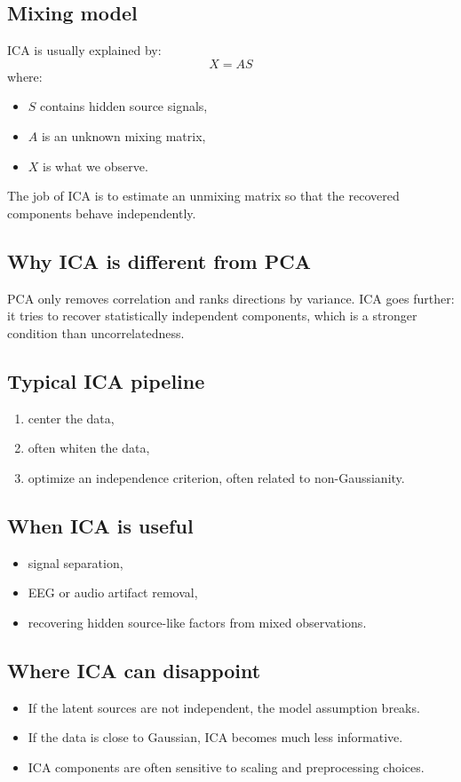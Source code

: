 \documentclass[11pt]{article}
\begin{document}
\subsection{Mixing model}
ICA is usually explained by:
\[
  X = A S
\]
where:
\begin{itemize}[leftmargin=*]
  \item $S$ contains hidden source signals,
  \item $A$ is an unknown mixing matrix,
  \item $X$ is what we observe.
\end{itemize}
The job of ICA is to estimate an unmixing matrix so that the recovered components behave independently.

\subsection{Why ICA is different from PCA}
PCA only removes correlation and ranks directions by variance.
ICA goes further: it tries to recover statistically independent components, which is a stronger condition than uncorrelatedness.

\subsection{Typical ICA pipeline}
\begin{enumerate}[leftmargin=*]
  \item center the data,
  \item often whiten the data,
  \item optimize an independence criterion, often related to non-Gaussianity.
\end{enumerate}

\subsection{When ICA is useful}
\begin{itemize}[leftmargin=*]
  \item signal separation,
  \item EEG or audio artifact removal,
  \item recovering hidden source-like factors from mixed observations.
\end{itemize}

\subsection{Where ICA can disappoint}
\begin{itemize}[leftmargin=*]
  \item If the latent sources are not independent, the model assumption breaks.
  \item If the data is close to Gaussian, ICA becomes much less informative.
  \item ICA components are often sensitive to scaling and preprocessing choices.
\end{itemize}
\end{document}
